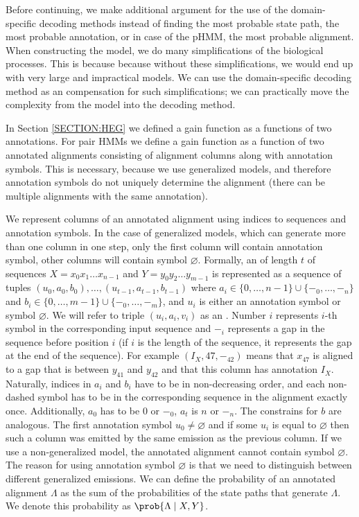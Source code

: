Before continuing, we make additional argument for the use of the
domain-specific decoding methods instead of finding the most probable state
path, the most probable annotation, or in case of the pHMM, the most probable
alignment. When constructing the model, we do many simplifications of the
biological processes. This is because because without these simplifications, we
would end up with very large and impractical models. We can use the
domain-specific decoding method as an compensation for such simplifications; we
can practically move the complexity from the model into the decoding method.

In Section \ref{SECTION:HEG} we defined a gain function as a functions of two
annotations. For pair HMMs we define a gain function as a function of two
annotated alignments consisting of alignment columns along with annotation
symbols. This is necessary, because we use generalized models, and therefore
annotation symbols do not uniquely determine the alignment (there can be
multiple alignments with the same annotation).

We represent columns of an annotated alignment using indices to sequences and
annotation symbols. In the case of generalized models, which can generate more
than one column in one step, only the first column will contain annotation
symbol, other columns will contain symbol $\varnothing$. Formally, an
 of length $t$ of sequences $X=x_0x_1\dots
x_{n-1}$ and $Y=y_0y_2\dots y_{m-1}$ is represented as a sequence of tuples
$(u_0, a_0, b_0), \dots, (u_{t-1}, a_{t-1}, b_{t-1})$ where $a_i\in \{0, \dots,
{n-1}\}\cup\{-_0, \dots, -_n\}$ and $b_i \in \{0, \dots, m-1\}\cup\{-_0, \dots,
-_m\}$, and $u_i$ is either an annotation symbol or symbol $\varnothing$. We
will refer to triple $(u_i, a_i, v_i)$ as an .  Number $i$ represents $i$-th symbol in the corresponding input
sequence and $-_i$ represents a gap in the sequence before position $i$ (if $i$
is the length of the sequence, it represents the gap at the end of the
sequence). For example $(I_X, 47, -_{42})$ means that $x_{47}$ is aligned to a
gap that is between $y_{41}$ and $y_{42}$ and that this column has annotation
$I_X$.  Naturally, indices in $a_i$ and $b_i$ have to be in non-decreasing
order, and each non-dashed symbol has to be in the corresponding sequence in
the alignment exactly once. Additionally, $a_0$ has to be $0$ or $-_{0}$, $a_t$
is $n$ or $-_n$. The constrains for $b$ are analogous.  The first annotation
symbol $u_0\not=\varnothing$ and if some $u_i$ is equal to $\varnothing$ then
such a column was emitted by the same emission as the previous column.  If we
use a non-generalized model, the annotated alignment cannot contain symbol
$\varnothing$. The reason for using annotation symbol $\varnothing$ is that we
need to distinguish between different generalized emissions.  We can define the
probability of an annotated alignment $\Lambda$ as the sum of the probabilities
of the state paths that generate $\Lambda$. We denote this probability as
$\prob{\Lambda\mid X, Y}$.

